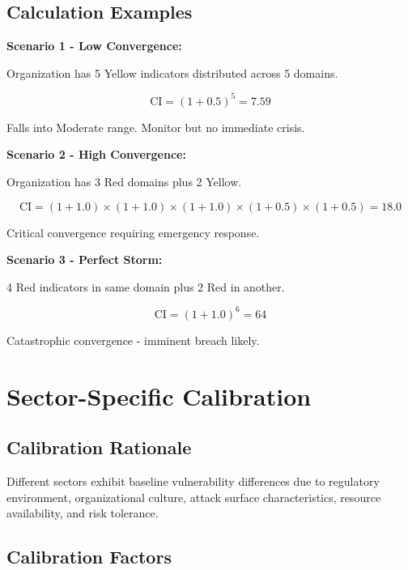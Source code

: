 \documentclass[11pt,a4paper]{article}
\begin{document}
\subsection{Calculation Examples}

\textbf{Scenario 1 - Low Convergence:}

Organization has 5 Yellow indicators distributed across 5 domains.

\[
\text{CI} = (1+0.5)^5 = 7.59
\]

Falls into Moderate range. Monitor but no immediate crisis.

\textbf{Scenario 2 - High Convergence:}

Organization has 3 Red domains plus 2 Yellow.

\[
\text{CI} = (1+1.0) \times (1+1.0) \times (1+1.0) \times (1+0.5) \times (1+0.5) = 18.0
\]

Critical convergence requiring emergency response.

\textbf{Scenario 3 - Perfect Storm:}

4 Red indicators in same domain plus 2 Red in another.

\[
\text{CI} = (1+1.0)^6 = 64
\]

Catastrophic convergence - imminent breach likely.

\section{Sector-Specific Calibration}

\subsection{Calibration Rationale}

Different sectors exhibit baseline vulnerability differences due to regulatory environment, organizational culture, attack surface characteristics, resource availability, and risk tolerance.

\subsection{Calibration Factors}
\end{document}
